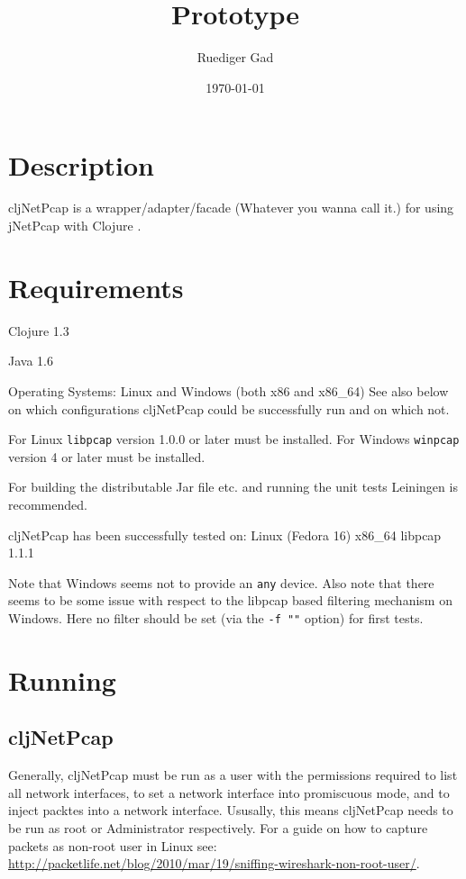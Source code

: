 \documentclass[11pt,a4paper,parskip=half]{scrartcl}
\title{
\programname\\
Prototype
}
\author{
Ruediger Gad\\
}
\date{\today}
\newcommand{\programname}{{cljNetPcap}}
\begin{document}
\maketitle

\tableofcontents

\listoffigures

\section{Description}
\programname{} is a wrapper/adapter/facade (Whatever you wanna call it.) for using jNetPcap \cite{jnetpcap} with Clojure \cite{clojure}.

\section{Requirements}
Clojure 1.3

Java 1.6

Operating Systems: Linux and Windows (both x86 and x86\_64) 
See also below on which configurations \programname{} could be successfully run and on which not.

For Linux \texttt{libpcap}\cite{libpcap} version 1.0.0 or later must be installed.
For Windows \texttt{winpcap}\cite{winpcap} version 4 or later must be installed.

For building the distributable Jar file etc. and running the unit tests Leiningen \cite{leiningen} is recommended.

\programname{} has been successfully tested on: 
Linux (Fedora 16)  x86\_64 libpcap 1.1.1

Note that Windows seems not to provide an \texttt{any} device.
Also note that there seems to be some issue with respect to the libpcap based filtering mechanism on Windows.
Here no filter should be set (via the \texttt{-f ""} option) for first tests.

\section{Running}
\subsection{\programname{}}
\label{sec:running}
Generally, \programname{} must be run as a user with the permissions required to list all network interfaces, to set a network interface into promiscuous mode, and to inject packtes into a network interface.
Ususally, this means \programname{} needs to be run as root or Administrator respectively.
For a guide on how to capture packets as non-root user in Linux see: \url{http://packetlife.net/blog/2010/mar/19/sniffing-wireshark-non-root-user/}.
\end{document}
